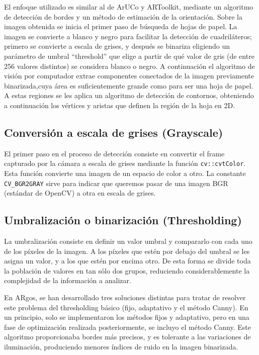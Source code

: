 El enfoque utilizado es similar al de ArUCo y ARToolkit, mediante un algoritmo de detección de bordes y un
método de estimación de la orientación. Sobre la imagen obtenida se inicia el primer paso de búsqueda de hojas de
papel. La imagen se convierte a blanco y negro para facilitar la detección de cuadriláteros;
primero se convierte a escala de grises, y después se binariza eligiendo un parámetro de
umbral “threshold” que elige a partir de qué valor de gris (de entre 256 valores distintos) se
considera blanco o negro. A continuación el algoritmo de visión por computador
extrae componentes conectados de la imagen previamente binarizada,cuya área es
suficientemente grande como para ser una hoja de papel. A estas regiones se les aplica un algoritmo
de detección de contornos, obteniendo a continuación los vértices y aristas que definen la
región de la hoja en 2D.

\subsection{Conversión a escala de grises (Grayscale)}
El primer paso en el proceso de detección consiste en convertir el frame capturado por la cámara a
escala de grises mediante la función \texttt{cv::cvtColor}. Esta función convierte una imagen de un
espacio de color a otro. La constante \texttt{CV\_BGR2GRAY} sirve para indicar que queremos pasar de
una imagen BGR (estándar de OpenCV) a otra en escala de grises.

\subsection{Umbralización o binarización (Thresholding)}
La umbralización consiste en definir un valor umbral y compararlo con cada uno de los píxeles de la
imagen. A los píxeles que estén por debajo del umbral se les asigna un valor, y a los que estén por
encima otro. De esta forma se divide toda la población de valores en tan sólo dos grupos, reduciendo
considerablemente la complejidad de la información a analizar.

En ARgos, se han desarrollado tres soluciones distintas para tratar de resolver este problema del
thresholding básico (fijo, adaptativo y el método Canny). En un principio, solo se implementaron
los métodos fijos y adaptativo, pero en una fase de optimización realizada posteriormente, se incluyo
el método Canny. Este algoritmo proporcionaba bordes más precisos, y es  tolerante a las
variaciones de iluminación, produciendo menores índices de ruido en la imagen binarizada.


